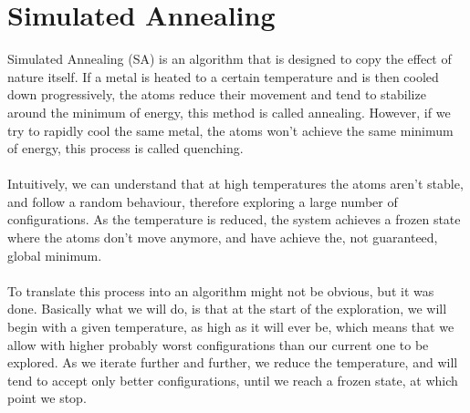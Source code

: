 \documentclass[a4paper]{article}
\begin{document}
\section{Simulated Annealing}
Simulated Annealing (SA) is an algorithm that is designed to copy the effect of nature itself. If a metal is heated to a certain temperature and is then cooled down progressively, the atoms reduce their movement and tend to stabilize around the minimum of energy, this method is called annealing. However, if we try to rapidly cool the same metal, the atoms won't achieve the same minimum of energy, this process is called quenching.\\\\
Intuitively, we can understand that at high temperatures the atoms aren't stable, and follow a random behaviour, therefore exploring a large number of configurations. As the temperature is reduced, the system achieves a frozen state where the atoms don't move anymore, and have achieve the, not guaranteed, global minimum.\\\\
To translate this process into an algorithm might not be obvious, but it was done. Basically what we will do, is that at the start of the exploration, we will begin with a given temperature, as high as it will ever be, which means that we allow with higher probably worst configurations than our current one to be explored. As we iterate further and further, we reduce the temperature, and will tend to accept only better configurations, until we reach a frozen state, at which point we stop.
\end{document}
